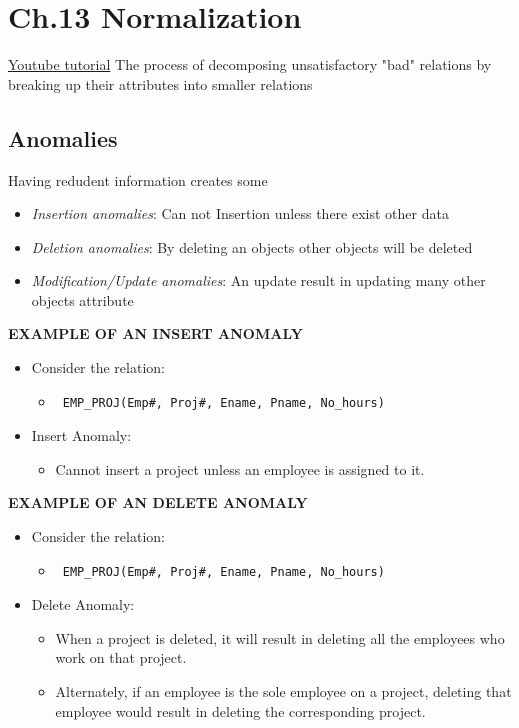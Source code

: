 \newpage
\section{Ch.13 Normalization}
\href{https://www.youtube.com/watch?v=xoTyrdT9SZI}{Youtube tutorial}
The process of decomposing unsatisfactory "bad"
relations by breaking up their attributes into
smaller relations


\subsection{Anomalies}
Having redudent information creates some 
\begin{itemize}
    \item \textit{Insertion anomalies}: Can not Insertion unless there exist other data
    \item \textit{Deletion anomalies}: By deleting an objects other objects will be deleted 
    \item \textit{Modification/Update anomalies}: An update result in updating many other objects attribute
\end{itemize}

\textbf{EXAMPLE OF AN INSERT ANOMALY}
\begin{itemize}
    \item Consider the relation:
    \begin{itemize}
        \item  \begin{verbatim} EMP_PROJ(Emp#, Proj#, Ename, Pname, No_hours) \end{verbatim}
    \end{itemize}
    \item Insert Anomaly:
    \begin{itemize}
        \item Cannot insert a project unless an employee is
            assigned to it.
    \end{itemize}
\end{itemize}


\textbf{EXAMPLE OF AN DELETE ANOMALY}
\begin{itemize}
    \item Consider the relation:
    \begin{itemize}
        \item  \begin{verbatim} EMP_PROJ(Emp#, Proj#, Ename, Pname, No_hours) \end{verbatim}
    \end{itemize}
    \item Delete Anomaly:
    \begin{itemize}
        \item When a project is deleted, it will result in deleting
            all the employees who work on that project.
        \item Alternately, if an employee is the sole employee
            on a project, deleting that employee would result in
            deleting the corresponding project.
    \end{itemize}
\end{itemize}


